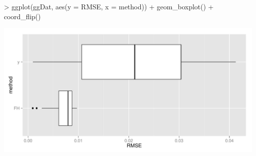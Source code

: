 \documentclass[article]{ajs}
\begin{document}
\begin{Schunk}
\begin{Sinput}
> ggplot(ggDat, aes(y = RMSE, x = method)) + geom_boxplot() + coord_flip()
\end{Sinput}
\end{Schunk}

\includegraphics[width = \textwidth]{saeSim-modelSimRMSE.pdf}
\end{document}
